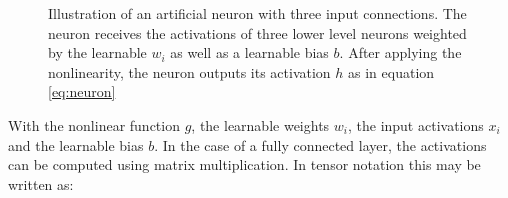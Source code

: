 \begin{figure}
    \centering
{}
\caption[Illustration of an artificial neuron with three input connections]{Illustration of an artificial neuron with three input connections. The neuron receives the activations of three lower level neurons weighted by the learnable $w_i$ as well as a learnable bias $b$. After applying the nonlinearity, the neuron outputs its activation $h$ as in equation  \ref{eq:neuron}}\label{fig:neuron}
\end{figure}\noindent
With the nonlinear function $g$, the learnable weights $w_i$, the input activations $x_i$ and the learnable bias $b$. In the case of a fully connected layer, the activations can be computed using matrix multiplication. In tensor notation this may be written as:
